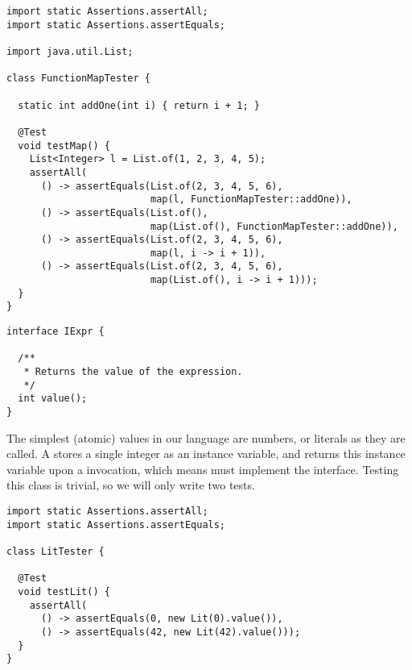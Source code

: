 \begin{lstlisting}[language=MyJava]
import static Assertions.assertAll;
import static Assertions.assertEquals;

import java.util.List;

class FunctionMapTester {

  static int addOne(int i) { return i + 1; }

  @Test
  void testMap() {
    List<Integer> l = List.of(1, 2, 3, 4, 5);
    assertAll(
      () -> assertEquals(List.of(2, 3, 4, 5, 6), 
                         map(l, FunctionMapTester::addOne)),
      () -> assertEquals(List.of(),   
                         map(List.of(), FunctionMapTester::addOne)),
      () -> assertEquals(List.of(2, 3, 4, 5, 6), 
                         map(l, i -> i + 1)),
      () -> assertEquals(List.of(2, 3, 4, 5, 6), 
                         map(List.of(), i -> i + 1)));
  }
}
\end{lstlisting}


\begin{lstlisting}[language=MyJava]
interface IExpr {

  /**
   * Returns the value of the expression.
   */
  int value();
}
\end{lstlisting}

The simplest (atomic) values in our language are numbers, or literals as they are called. A  stores a single integer as an instance variable, and returns this instance variable upon a  invocation, which means  must implement the  interface. Testing this class is trivial, so we will only write two tests.

\begin{lstlisting}[language=MyJava]
import static Assertions.assertAll;
import static Assertions.assertEquals;

class LitTester {

  @Test
  void testLit() {
    assertAll(
      () -> assertEquals(0, new Lit(0).value()),      
      () -> assertEquals(42, new Lit(42).value()));
  }
}
\end{lstlisting}

